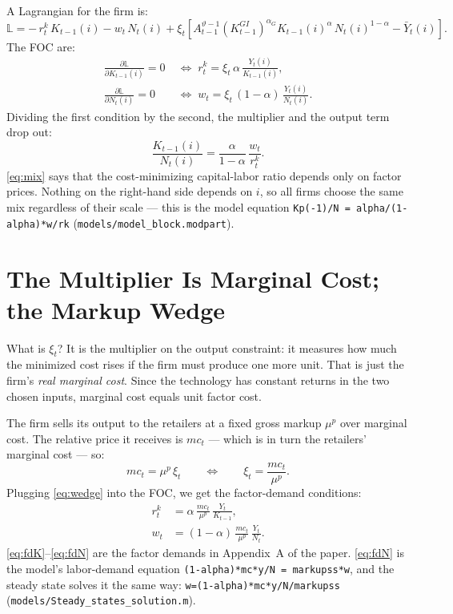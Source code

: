 \documentclass[11pt]{article}
\begin{document}
A Lagrangian for the firm is:
\begin{equation*}
    \mathbb{L} = -\,r_t^{k}\,K_{t-1}(i) - w_t\,N_t(i)
    + \xi_t\left[A_{t-1}^{\vartheta-1}\left(K_{t-1}^{GI}\right)^{\alpha_G}
      K_{t-1}(i)^{\alpha}\,N_t(i)^{1-\alpha} - \bar{Y}_t(i)\right].
\end{equation*}
The FOC are:
\begin{align*}
    \frac{\partial\mathbb{L}}{\partial K_{t-1}(i)} = 0
    &\;\Leftrightarrow\; r_t^{k} = \xi_t\,\alpha\,\frac{Y_t(i)}{K_{t-1}(i)},\\
    \frac{\partial\mathbb{L}}{\partial N_t(i)} = 0
    &\;\Leftrightarrow\; w_t = \xi_t\,(1-\alpha)\,\frac{Y_t(i)}{N_t(i)}.
\end{align*}
Dividing the first condition by the second, the multiplier and the output term drop
out:
\begin{equation}\label{eq:mix}
    \frac{K_{t-1}(i)}{N_t(i)} = \frac{\alpha}{1-\alpha}\,\frac{w_t}{r_t^{k}}.
\end{equation}
\eqref{eq:mix} says that the cost-minimizing capital-labor ratio depends only on
factor prices. Nothing on the right-hand side depends on $i$, so all firms choose
the same mix regardless of their scale --- this is the model equation
\texttt{Kp(-1)/N = alpha/(1-alpha)*w/rk} (\texttt{models/model\_block.modpart}).

\section{The Multiplier Is Marginal Cost; the Markup Wedge}

What is $\xi_t$? It is the multiplier on the output constraint: it measures how
much the minimized cost rises if the firm must produce one more unit. That is just
the firm's \emph{real marginal cost}. Since the technology has constant returns in
the two chosen inputs, marginal cost equals unit factor cost.

The firm sells its output to the retailers at a fixed gross markup $\mu^{p}$ over
marginal cost. The relative price it receives is $mc_t$ --- which is in turn the
retailers' marginal cost --- so:
\begin{equation}\label{eq:wedge}
    mc_t = \mu^{p}\,\xi_t
    \qquad\Leftrightarrow\qquad
    \xi_t = \frac{mc_t}{\mu^{p}}.
\end{equation}
Plugging \eqref{eq:wedge} into the FOC, we get the factor-demand conditions:
\begin{align}
    r_t^{k} &= \alpha\,\frac{mc_t}{\mu^{p}}\,\frac{Y_t}{K_{t-1}},\label{eq:fdK}\\
    w_t &= (1-\alpha)\,\frac{mc_t}{\mu^{p}}\,\frac{Y_t}{N_t}.\label{eq:fdN}
\end{align}
\eqref{eq:fdK}--\eqref{eq:fdN} are the factor demands in Appendix~A of the paper.
\eqref{eq:fdN} is the model's labor-demand equation
\texttt{(1-alpha)*mc*y/N = markupss*w}, and the steady state solves it the same way:
\texttt{w=(1-alpha)*mc*y/N/markupss} (\texttt{models/Steady\_states\_solution.m}).
\end{document}
